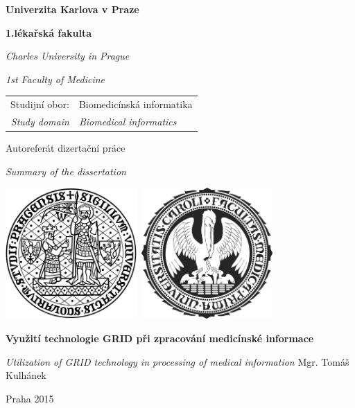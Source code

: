 \begin{center}
\large
\textbf{\Large{Univerzita Karlova v Praze}}

\textbf{\Large{1.lékařská fakulta}} 

\textit{Charles University in Prague} 

\textit{1st Faculty of Medicine}
\vfill
\normalsize
\begin{tabular}{rl}
Studijní obor:  & Biomedicínská informatika \\
\noalign{\vspace{-1mm}}
\textit{Study domain} & \textit{Biomedical informatics} \\
\end{tabular}

\vfill

{\Large Autoreferát dizertační práce}

\textit{\large Summary of the dissertation}


\centerline{\mbox{\includegraphics[width=50mm]{../img/logouk.png}
\includegraphics[width=50mm]{../img/logolf1.png}}}


\vfill



\textbf{\large Využití technologie GRID při zpracování medicínské informace}

\vspace{2mm}
\textit{\large Utilization of GRID technology in processing of medical information}
\vfill
{\Large Mgr. Tomáš Kulhánek}




\vfill

Praha 2015

\end{center}
